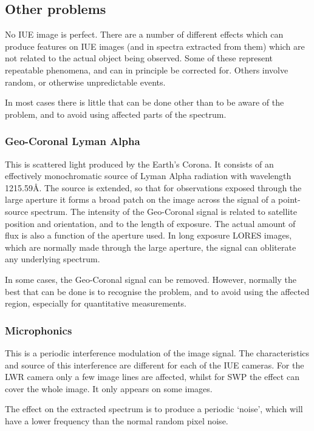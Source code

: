 \subsection{Other problems}

No IUE image is perfect.  There are a number of different effects which
can produce features on IUE images (and in spectra extracted from them)
which are not related to the actual object being observed.  Some of these
represent repeatable phenomena, and can in principle be corrected for.  Others
involve random, or otherwise unpredictable events.

In most cases there is little that can be done other than to be aware of
the problem, and to avoid using affected parts of the spectrum.

\subsubsection{Geo-Coronal Lyman Alpha}

This is scattered light produced by the Earth's Corona.  It consists of an
effectively monochromatic source of Lyman Alpha radiation with wavelength
1215.59\AA\@.  The source is extended, so that for observations
exposed through the large aperture it forms a broad patch on the image across
the signal of a point-source spectrum.  The intensity of the
Geo-Coronal signal is related to satellite position and orientation, and to the
length of exposure.  The actual amount of flux is also a function of the
aperture used.  In long exposure LORES images, which are normally made through
the large aperture, the signal can obliterate any underlying spectrum.

In some cases, the Geo-Coronal signal can be removed.  However, normally the
best that can be done is to recognise the problem, and to avoid using the
affected region, especially for quantitative measurements.

\subsubsection{Microphonics}

This is a periodic interference modulation of the image signal.  The
characteristics and source of this interference are different for each of the
IUE cameras.  For the LWR camera only a few image lines are affected,
whilst for SWP the effect can cover the whole image.  It only appears on
some images.

The effect on the extracted spectrum is to produce a periodic `noise',
which will have a lower frequency than the normal random pixel noise.


